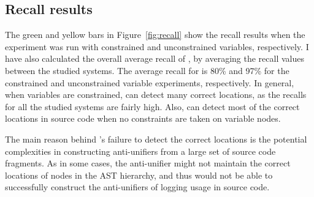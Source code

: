\subsection{{Recall results}}  \label{recall-results}
The green and yellow bars in Figure~\ref{fig:recall}  show the recall results when the experiment was run with constrained and unconstrained variables, respectively. I have also calculated the overall average recall of , by averaging the recall values between the studied systems. The average recall for  is 80\% and 97\% for the constrained and unconstrained variable experiments, respectively. In general, when variables are constrained,  can detect many correct locations, as the recalls for all the studied systems are fairly high. Also,  can detect most of the correct locations in source code when no constraints are taken on variable nodes.

The main reason behind 's failure to detect the correct locations is the potential complexities in constructing anti-unifiers from a large set of source code fragments. As in some cases, the anti-unifier might not maintain the correct locations of nodes in the AST hierarchy, and thus  would not be able to successfully construct the anti-unifiers of logging usage in source code.




